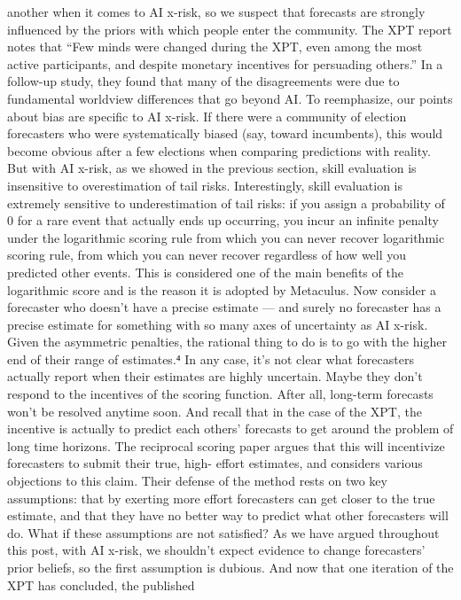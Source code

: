 another when it comes to AI x-risk, so we suspect that forecasts are
strongly inﬂuenced by the priors with which people enter the
community. The XPT report notes that “Few minds were changed
during the XPT, even among the most active participants, and
despite monetary incentives for persuading others.” In a follow-up
study, they found that many of the disagreements were due to
fundamental worldview differences that go beyond AI.
To reemphasize, our points about bias are speciﬁc to AI x-risk. If
there were a community of election forecasters who were
systematically biased (say, toward incumbents), this would become
obvious after a few elections when comparing predictions with reality.
But with AI x-risk, as we showed in the previous section, skill
evaluation is insensitive to overestimation of tail risks.
Interestingly, skill evaluation is extremely sensitive to underestimation
of tail risks: if you assign a probability of 0 for a rare event that
actually ends up occurring, you incur an inﬁnite penalty under the
logarithmic scoring rule from which you can never recover
logarithmic scoring rule, from which you can never recover
regardless of how well you predicted other events. This is considered
one of the main beneﬁts of the logarithmic score and is the reason it
is adopted by Metaculus.
Now consider a forecaster who doesn’t have a precise estimate —
and surely no forecaster has a precise estimate for something with
so many axes of uncertainty as AI x-risk. Given the asymmetric
penalties, the rational thing to do is to go with the higher end of their
range of estimates.⁴
In any case, it’s not clear what forecasters actually report when their
estimates are highly uncertain. Maybe they don’t respond to the
incentives of the scoring function. After all, long-term forecasts won’t
be resolved anytime soon. And recall that in the case of the XPT, the
incentive is actually to predict each others’ forecasts to get around
the problem of long time horizons. The reciprocal scoring paper
argues that this will incentivize forecasters to submit their true, high-
effort estimates, and considers various objections to this claim. Their
defense of the method rests on two key assumptions: that by
exerting more effort forecasters can get closer to the true estimate,
and that they have no better way to predict what other forecasters
will do.
What if these assumptions are not satisﬁed? As we have argued
throughout this post, with AI x-risk, we shouldn’t expect evidence to
change forecasters’ prior beliefs, so the ﬁrst assumption is dubious.
And now that one iteration of the XPT has concluded, the published
